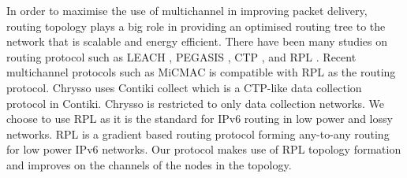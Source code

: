 In order to maximise the use of multichannel in improving packet delivery, routing topology plays a big role in providing an optimised routing tree to the network that is scalable and energy efficient. There have been many studies on routing protocol such as LEACH \cite{leach}, PEGASIS \cite{pegasis}, CTP \cite{ctp}, and RPL \cite{winter2012rpl}. Recent multichannel protocols such as MiCMAC is compatible with RPL as the routing protocol. Chrysso uses Contiki collect which is a CTP-like data collection protocol in Contiki. Chrysso is restricted to only data collection networks. We choose to use RPL as it is the standard for IPv6 routing in low power and lossy networks. RPL \cite{winter2012rpl, routingmetrics, mrhof} is a gradient based routing protocol forming any-to-any routing for low power IPv6 networks. Our protocol makes use of RPL topology formation and improves on the channels of the nodes in the topology.